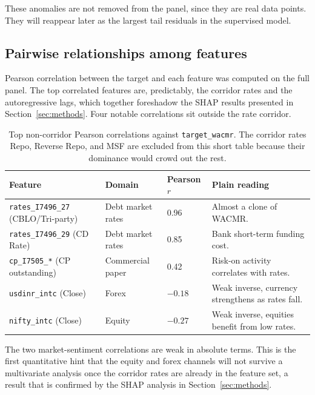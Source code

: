 These anomalies are not removed from the panel, since they are real
data points. They will reappear later as the largest tail residuals
in the supervised model.

\subsection{Pairwise relationships among features}

Pearson correlation between the target and each feature was computed
on the full panel. The top correlated features are, predictably, the
corridor rates and the autoregressive lags, which together foreshadow
the SHAP results presented in Section~\ref{sec:methods}. Four notable
correlations sit outside the rate corridor.

\begin{table}[H]
\caption{Top non-corridor Pearson correlations against
\texttt{target\_wacmr}. The corridor rates Repo, Reverse Repo, and MSF
are excluded from this short table because their dominance would crowd
out the rest.}
\label{tab:correlations-noncorridor}
\renewcommand{\arraystretch}{1.2}
\begin{tabularx}{\linewidth}{@{} Y l l Y @{}}
\toprule
{}\color{white}\textbf{Feature} &
\color{white}\textbf{Domain} &
\color{white}\textbf{Pearson $r$} &
\color{white}\textbf{Plain reading} \\
\midrule
\texttt{rates\_I7496\_27} (CBLO/Tri-party) & Debt market rates & 0.96 & Almost a clone of WACMR. \\
\texttt{rates\_I7496\_29} (CD Rate) & Debt market rates & 0.85 & Bank short-term funding cost. \\
\texttt{cp\_I7505\_*} (CP outstanding) & Commercial paper & 0.42 & Risk-on activity correlates with rates. \\
\texttt{usdinr\_intc} (Close) & Forex & $-0.18$ & Weak inverse, currency strengthens as rates fall. \\
\texttt{nifty\_intc} (Close) & Equity & $-0.27$ & Weak inverse, equities benefit from low rates. \\
\bottomrule
\end{tabularx}
\end{table}

The two market-sentiment correlations are weak in absolute terms.
This is the first quantitative hint that the equity and forex channels
will not survive a multivariate analysis once the corridor rates are
already in the feature set, a result that is confirmed by the SHAP
analysis in Section~\ref{sec:methods}.
